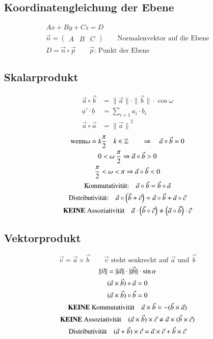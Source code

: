 \subsection{Koordinatengleichung der Ebene}
\begin{gather}
Ax+By+Cz=D \\
\vec{n}=\begin{pmatrix}A&B&C\end{pmatrix} \qquad \text{Normalenvektor auf die Ebene} \\
D=\vec{n}\circ\vec{p} \qquad \vec{p}\text{: Punkt der Ebene}
\end{gather}


\subsection{Skalarprodukt}
\begin{align}
\vec{a}\circ\vec{b} & = \|\vec{a}\|\cdot\|\vec{b}\|\cdot\cos\omega \\
\underline{a}'\cdot\underline{b} & = \sum_{i=1}a_i\cdot b_i \\
\vec{a}\circ\vec{a} & = {\|\vec{a}\|}^2
\end{align}
\begin{gather}
\text{wenn} \omega = k\frac{\pi}{2} \quad k\in\mathbb{Z} \qquad
\Rightarrow \quad \vec{a}\circ\vec{b}=0 \\
0 < \omega \ \frac{\pi}{2} \Rightarrow \vec{a}\circ\vec{b} > 0 \\
\frac{\pi}{2} < \omega < \pi \Rightarrow \vec{a}\circ\vec{b} < 0 \\
\text{Kommutativit\"at:} \quad \vec{a}\circ\vec{b} = \vec{b}\circ\vec{a} \\
\text{Distributivit\"at:} \quad \vec{a}\circ\left(\vec{b}+\vec{c}\right)
  = \vec{a}\circ\vec{b}+\vec{a}\circ\vec{c}\\
\text{\textbf{KEINE} Assoziativit\"at} \quad \vec{a}\cdot\left(\vec{b}\circ\vec{c}\right) \neq \left(\vec{a}\circ\vec{b}\right)\cdot\vec{c}
\end{gather}


\subsection{Vektorprodukt}
\begin{equation}
\vec{v} = \vec{a}\times\vec{b} \qquad\vec{v}\text{ steht senkrecht auf }\vec{a}\text{ und }\vec{b}
\end{equation}
\begin{gather}
  \|\vec{v}\| = \|\vec{a}\|\cdot\|\vec{b}\|\cdot\sin{\alpha} \\
  (\vec{a}\times\vec{b})\circ\vec{a} = 0 \\
  (\vec{a}\times\vec{b})\circ\vec{b} = 0 \\
  \text{\textbf{KEINE} Kommutativit\"at} \quad \vec{a}\times\vec{b} = -(\vec{b}\times\vec{a}) \\
  \text{\textbf{KEINE} Assoziativit\"at} \quad (\vec{a}\times\vec{b})\times\vec{c} \neq \vec{a}\times(\vec{b}\times\vec{c}) \\
  \text{Distributivit\"at} \quad (\vec{a}+\vec{b})\times\vec{c} = \vec{a}\times\vec{c} + \vec{b}\times\vec{c}
\end{gather}


